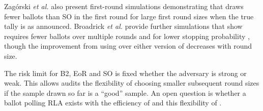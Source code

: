 Zag\'{o}rski {\em et al.}  also present first-round simulations demonstrating that \Minerva draws fewer ballots than SO \BRAVO in the first round for large first round sizes when the true tally is as announced. 
Broadrick {\em et al.} provide further simulations that show \Minerva requires fewer ballots over multiple rounds and for lower stopping probability \cite{simulations}, though the improvement from using \Minerva over either version of \BRAVO decreases with round size. 

The risk limit for B2, EoR and SO \BRAVO is fixed whether the adversary is strong or weak. This allows \BRAVO audits the flexibility of choosing smaller subsequent round sizes if the sample drawn so far is a ``good'' sample. An open question is whether a ballot polling RLA exists with the efficiency of \Minerva and this flexibility of \BRAVO.

